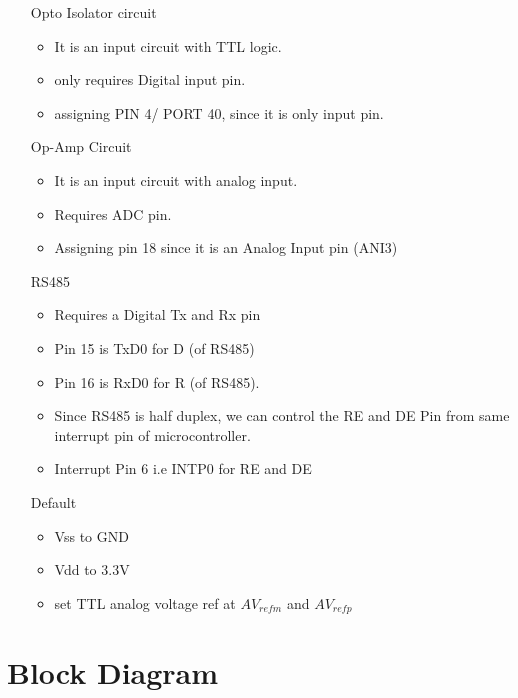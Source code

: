 \documentclass[11pt]{article}
\begin{document}
\begin{itemize}
\begin{itemize}
					\item[Opto Isolator circuit]
						\begin{itemize}
							\item It is an input circuit with TTL logic.
							\item only requires Digital input pin.
							\item assigning PIN 4/ PORT 40, since it is only input pin.
						\end{itemize}
					\item[Op-Amp Circuit]
						\begin{itemize}
							\item It is an input circuit with analog input.
							\item Requires ADC pin.
							\item Assigning pin 18 since it is an Analog Input pin (ANI3)
						\end{itemize}
					\item[RS485]
						\begin{itemize}
							\item Requires a Digital Tx and Rx pin
							\item Pin 15 is TxD0 for D (of RS485)
							\item Pin 16 is RxD0 for R (of RS485).
							\item Since RS485 is half duplex, we can control the RE and DE Pin from same interrupt pin of microcontroller.
							\item Interrupt Pin 6 i.e INTP0 for RE and DE 
						\end{itemize}
					
					\item[Default]
						\begin{itemize}
							\item Vss to GND
							\item Vdd to 3.3V
							\item set TTL analog voltage ref at $AV_{refm}$ and      
							$ AV_{refp}$
						\end{itemize}
				\end{itemize}
		\end{itemize}
		
	\section{Block Diagram}
		
\end{document}
